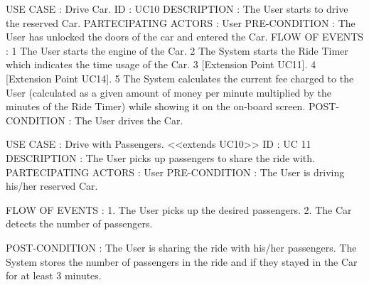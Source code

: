 USE CASE : Drive Car. 
ID : UC10				
DESCRIPTION  : The User starts to drive the reserved Car.
PARTECIPATING ACTORS : User 
PRE-CONDITION : The User has unlocked the doors of the car and entered the Car.
FLOW OF EVENTS : 
1 The User starts the engine of the Car.
2 The System starts the Ride Timer which indicates the time usage of the Car.
3 [Extension Point UC11].
4 [Extension Point UC14].
5 The System calculates the current fee charged to the User (calculated as a given amount of money per minute multiplied by the minutes of the Ride Timer) while showing it on the on-board screen.
POST-CONDITION :  
The User drives the Car. 




USE CASE : Drive with Passengers.  <<extends UC10>>
ID : UC 11
DESCRIPTION : The User picks up passengers to share the ride with.
PARTECIPATING ACTORS : User
PRE-CONDITION : The User is driving his/her reserved Car.

FLOW OF EVENTS : 
1. The User picks up the desired passengers.
2. The Car detects the number of passengers.

POST-CONDITION :  
The User is sharing the ride with his/her passengers.
The System stores the number of passengers in the ride and if they stayed in the Car for at least 3 minutes.

